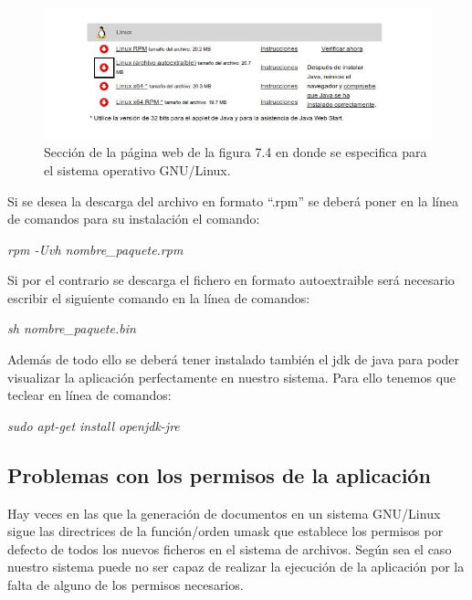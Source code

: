 \begin{figure}[H]
\includegraphics[width=15cm]{./imagenes_documentacion/captura_4.jpeg}
\caption{Sección de la página web de la figura 7.4 en donde se especifica para el sistema operativo GNU/Linux.}
\end{figure}

Si se desea la descarga del archivo en formato ``.rpm'' se deberá poner en la línea de comandos para su instalación el comando:\\

\begin{center} \emph{rpm -Uvh nombre\_paquete.rpm}\\ \end{center}

Si por el contrario se descarga el fichero en formato autoextraible será necesario escribir el siguiente comando en la línea de comandos:\\

\begin{center} \emph{sh nombre\_paquete.bin}\\ \end{center}

Además de todo ello se deberá tener instalado también el jdk de java para poder visualizar la aplicación perfectamente en nuestro sistema. Para ello tenemos que teclear en línea de comandos:\\
\begin{center} \emph{sudo apt-get install openjdk-jre} \\ \end{center}

\subsection{Problemas con los permisos de la aplicación}

Hay veces en las que la generación de documentos en un sistema GNU/Linux sigue las directrices de la función/orden umask que establece los permisos por defecto de todos los nuevos ficheros en el sistema de archivos. Según sea el caso nuestro sistema puede no ser capaz de realizar la ejecución de la aplicación por la falta de alguno de los permisos necesarios.\\

